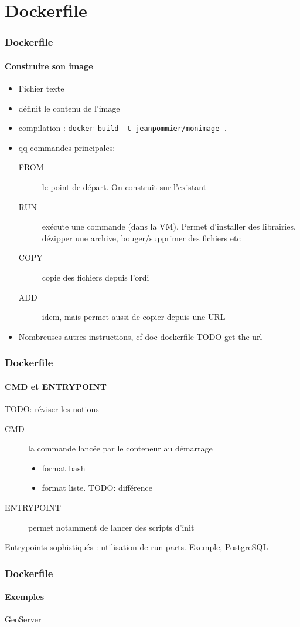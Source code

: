 \documentclass[11pt]{beamer}
\begin{document}
\section{Dockerfile}

\begin{frame}[fragile]
\frametitle{Dockerfile}
\framesubtitle{Construire son image}
\begin{itemize}
	\item Fichier texte
	\item définit le contenu de l'image
	\item compilation : \verb|docker build -t jeanpommier/monimage .|
	\item qq commandes principales:
	\begin{description}
		\item[FROM] le point de départ. On construit sur l'existant
		\item[RUN]  exécute une commande (dans la VM). Permet d'installer des librairies, dézipper une archive, bouger/supprimer des fichiers etc
		\item[COPY] copie des fichiers depuis l'ordi
		\item[ADD]  idem, mais permet aussi de copier depuis une URL
		
	\end{description}
	\item[]		Nombreuses autres instructions, cf doc dockerfile TODO get the url
\end{itemize}
\end{frame}

\begin{frame}[fragile]
\frametitle{Dockerfile}
\framesubtitle{CMD et ENTRYPOINT}
	TODO: réviser les notions
\begin{description}
	\item[CMD] la commande lancée par le conteneur au démarrage
	\begin{itemize}
		\item format bash
		\item format liste. TODO: différence
	\end{itemize}
	\item[ENTRYPOINT] permet notamment de lancer des scripts d'init
\end{description}

Entrypoints sophistiqués : utilisation de run-parts. Exemple, PostgreSQL

\end{frame}

\begin{frame}[fragile]
\frametitle{Dockerfile}
\framesubtitle{Exemples}
GeoServer

\end{frame}
\end{document}
